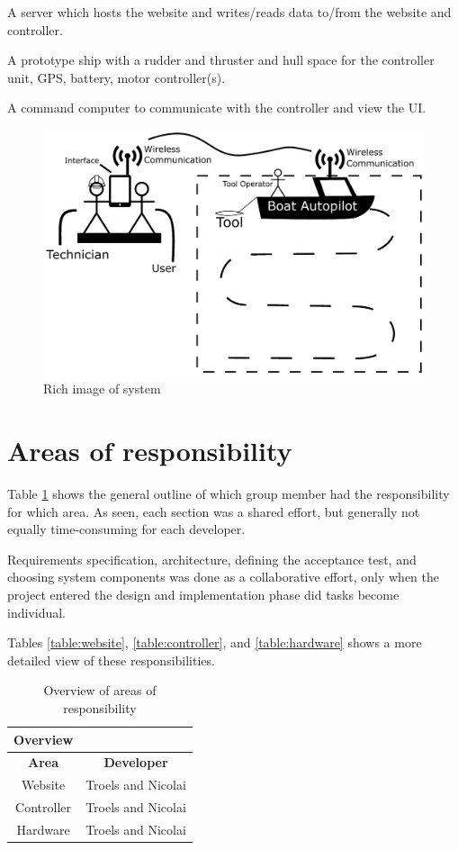 A server which hosts the website and writes/reads data to/from the website and controller.

A prototype ship with a rudder and thruster and hull space for the controller unit, GPS, battery, motor controller(s).

A command computer to communicate with the controller and view the UI.

\begin{figure}[H]
	\centering
	\includegraphics[width=1\linewidth]{rich_image}
	\caption{Rich image of system}
	\label{table:rich_image}
\end{figure}

\section{Areas of responsibility}
Table \ref{table:overview} shows the general outline of which group member had the responsibility for which area. As seen, each section was a shared effort, but generally not equally time-consuming for each developer.

Requirements specification, architecture, defining the acceptance test, and choosing system components was done as a collaborative effort, only when the project entered the design and implementation phase did tasks become individual. 

Tables \ref{table:website}, \ref{table:controller}, and \ref{table:hardware} shows a more detailed view of these responsibilities.

\begin{table}[H]
\centering
\begin{tabular}{|c|c|}
\hline 
\textbf{Overview} & \\ 
\hline 
\textbf{Area} & \textbf{Developer} \\ 
\hline 
Website & Troels and Nicolai \\ 
\hline 
Controller & Troels and Nicolai \\ 
\hline 
Hardware & Troels and Nicolai \\ 
\hline 
\end{tabular} 
\caption{Overview of areas of responsibility}
\label{table:overview}
\end{table}


